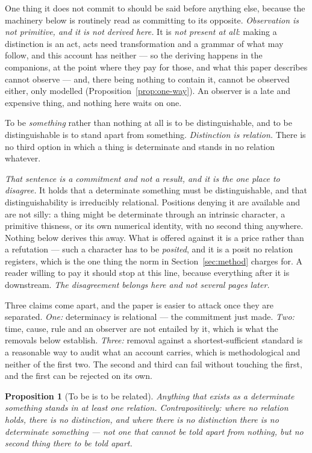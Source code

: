 \documentclass[11pt,a4paper]{article}
\newtheorem{proposition}{Proposition}
\begin{document}
One thing it does not commit to should be said before anything else, because the machinery below is
routinely read as committing to its opposite. \emph{Observation is not primitive, and it is not derived here.} It is
\emph{not present at all}: making a distinction is an act, acts need transformation and a grammar of
what may follow, and this account has neither --- so the deriving happens in the companions, at the
point where they pay for those, and what this paper describes cannot observe --- and, there being nothing to contain it, cannot be
observed either, only modelled (Proposition~\ref{prop:one-way}). An observer is a late and expensive
thing, and nothing here waits on one.

To be \emph{something} rather than nothing at all is to be distinguishable, and to be distinguishable is
to stand apart from something. \emph{Distinction is relation.} There is no third option in which a thing
is determinate and stands in no relation whatever.

\emph{That sentence is a commitment and not a result, and it is the one place to disagree.} It holds
that a determinate something must be distinguishable, and that distinguishability is irreducibly
relational. Positions denying it are available and are not silly: a thing might be determinate through
an intrinsic character, a primitive thisness, or its own numerical identity, with no second thing
anywhere. Nothing below derives this away. What is offered against it is a price rather than a
refutation --- such a character has to be \emph{posited}, and it is a posit no relation registers,
which is the one thing the norm in Section~\ref{sec:method} charges for. A reader willing to pay it
should stop at this line, because everything after it is downstream. \emph{The disagreement belongs
here and not several pages later.}

Three claims come apart, and the paper is easier to attack once they are separated. \emph{One:}
determinacy is relational --- the commitment just made. \emph{Two:} time, cause, rule and an observer
are not entailed by it, which is what the removals below establish. \emph{Three:} removal against a
shortest-sufficient standard is a reasonable way to audit what an account carries, which is
methodological and neither of the first two. The second and third can fail without touching the
first, and the first can be rejected on its own.

\begin{proposition}[To be is to be related]\label{prop:is}
Anything that exists as a determinate something stands in at least one relation. Contrapositively:
where no relation holds, there is no distinction, and where there is no distinction there is no
determinate something --- not one that cannot be told apart from nothing, but no second thing there to
be told apart.
\end{proposition}
\end{document}

